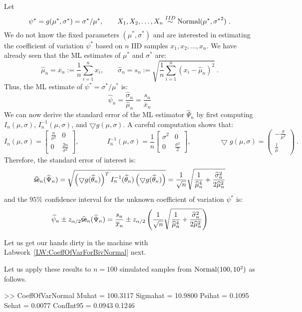 \begin{example}\label{EX:CoeffOfVarForBivNormal}
Let 
$$
\psi^* = g(\mu^*,\sigma^*)=\sigma^*/\mu^*, \qquad X_1,X_2,\ldots,X_n \overset{IID}{\sim} \normal(\mu^*,{\sigma^*}^2) \ .
$$ 
We do not know the fixed parameters $(\mu^*,\sigma^*)$ and are interested in estimating the coefficient of variation $\psi^*$ based on $n$ IID samples $x_1,x_2,\ldots,x_n$.  We have already seen that the ML estimates of $\mu^*$ and $\sigma^*$ are:
\[
\widehat{\mu}_n =  \overline{x}_n := \frac{1}{n}\sum_{i=1}^n x_i,  \qquad 
\widehat{\sigma}_n = s_n := \sqrt{\frac{1}{n} \sum_{i=1}^n (x_i-\widehat{\mu}_n)^2} \ .
\]
Thus, the ML estimate of $\psi^*=\sigma^*/ \mu^*$ is:
\[
\widehat{\psi}_n =  \frac {\widehat{\sigma}_n}{\widehat{\mu}_n} = \frac {s_n}{\overline{x}_n}
\] 
We can now derive the standard error of the ML estimator $\widehat{\Psi}_n$ by first computing $I_n(\mu,\sigma)$, $I_n^{-1}(\mu,\sigma)$, and $\bigtriangledown g(\mu,\sigma)$.  A careful computation shows that:
\[
I_n(\mu,\sigma) = 
\begin{bmatrix}
\frac{n}{\sigma^2} & 0\\
0 & \frac{2n}{\sigma^2}
\end{bmatrix},
\qquad \qquad
I_n^{-1}(\mu,\sigma) = 
\frac{1}{n}
\begin{bmatrix}
{\sigma^2} & 0\\
0 & \frac{\sigma^2}{2}
\end{bmatrix},
\qquad \qquad
\bigtriangledown g(\mu,\sigma) =
\begin{pmatrix}
-\frac{\sigma}{\mu^2} \\
\frac{1}{\mu}
\end{pmatrix} \ .
\]
Therefore, the standard error of interest is:
\[
\widehat{\sf{se}}_n(\widehat{\Psi}_n) = \sqrt{ \left( \bigtriangledown g(\widehat{\theta}_n) \right)^T I_n^{-1}(\widehat{\theta}_n) \left( \bigtriangledown g(\widehat{\theta}_n) \right)} = 
\frac{1}{\sqrt{n}} \sqrt{\frac{1}{\widehat{\mu}_n^4} + \frac{\widehat{\sigma}_n^2}{2 \widehat{\mu}_n^2}}
\]
and the $95\%$ confidence interval for the unknown coefficient of variation $\psi^*$ is:
\[
\widehat{\psi}_n \pm z_{\alpha/2} {\widehat{\sf{se}}_n(\widehat{\Psi}_n)}  = 
\frac{s_n}{\overline{x}_n} \pm z_{\alpha/2} \left( \frac{1}{\sqrt{n}} \sqrt{\frac{1}{\widehat{\mu}_n^4} + \frac{\widehat{\sigma}_n^2}{2 \widehat{\mu}_n^2}} \right)
\]
\end{example}

Let us get our hands dirty in the machine with Labwork~\ref{LW:CoeffOfVarForBivNormal} next.
\begin{labwork} \label{LW:CoeffOfVarForBivNormal}
Let us apply these results to $n=100$ simulated samples from $\mbox{{\rm Normal}}(100,10^2)$ as follows.
{}
\begin{VrbM}
>> CoeffOfVarNormal
Muhat =  100.3117
Sigmahat =   10.9800
Psihat =    0.1095
Sehat =    0.0077
ConfInt95 =    0.0943    0.1246
\end{VrbM}
\end{labwork}
